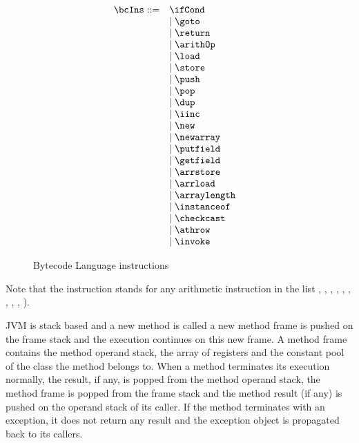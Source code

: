  \begin{figure}[h] 
      $$  \begin{array}{lll}
             \bcIns ::= & \ifCond & \\
	                & \mid \goto  & \\ 
			& \mid \return  &\\ 
			& \mid \arithOp  & \\ 
			& \mid \load & \\ 
			& \mid \store & \\
			& \mid \push & \\
			& \mid \pop & \\
			& \mid \dup & \\
			& \mid \iinc & \\
			& \mid \new & \\
			& \mid \newarray &  \\ 	
			& \mid \putfield  & \\
			& \mid \getfield  & \\
			& \mid \arrstore &  \\
			& \mid \arrload  & \\
			& \mid \arraylength  & \\
			& \mid \instanceof  & \\
			& \mid \checkcast &  \\
			& \mid \athrow  & \\
			& \mid \invoke  & \\
	\end{array}$$
        \caption{Bytecode Language instructions }
        \label{opSem:bclang}
  \end{figure}  
 	 
 Note that the instruction \arithOp stands for any arithmetic instruction in the list  , , , 
 , ,  , , , ,  ).
 
 JVM is stack based and a new method is called a new method frame is pushed on the frame stack and the execution continues on this new frame.
 A method frame contains the method operand stack, the array of registers and the constant pool of the class the method belongs to.
 When a method terminates its execution normally, the result, if any, is popped from the method operand stack, the method frame is
 popped from the frame stack and the method result (if any) is pushed on the operand stack
 of its caller. If the method terminates with an exception, it does not return any result and the exception object is propagated back to its callers.
 
